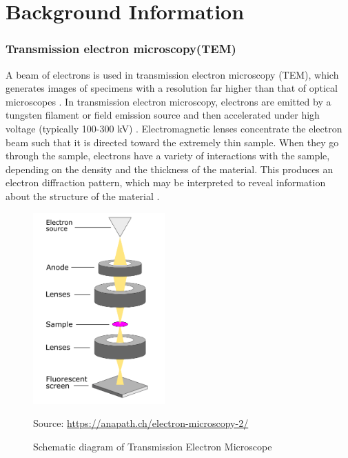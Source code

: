 \chapter{Background Information}\label{ch:Background Information}


\subsection{Transmission electron microscopy(TEM)}

A beam of electrons is used in transmission electron microscopy (TEM), which generates images of specimens with a resolution far higher than that of optical microscopes \cite{Egerton2004}. In transmission electron microscopy, electrons are emitted by a tungsten filament or field emission source and then accelerated under high voltage (typically 100-300 kV) \cite{Gault2008}. Electromagnetic lenses concentrate the electron beam such that it is directed toward the extremely thin sample. When they go through the sample, electrons have a variety of interactions with the sample, depending on the density and the thickness of the material. This produces an electron diffraction pattern, which may be interpreted to reveal information about the structure of the material \cite{Tang2017}.

\begin{figure}[thbp]
    \centering
    \includegraphics[width=0.45\textwidth]{img/TEM.png}
    \caption{Schematic diagram of Transmission Electron Microscope}\label{fig:TEM Schematic diagram}
    \tiny Source: \url{https://anapath.ch/electron-microscopy-2/}
\end{figure}

\vspace{20pt}

